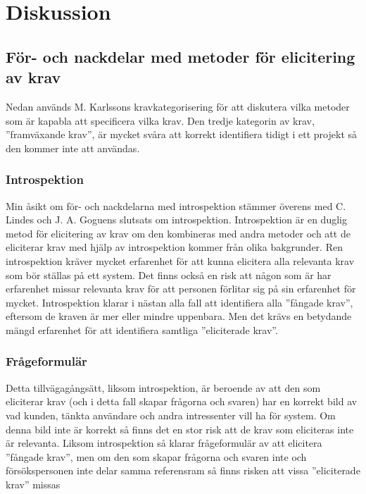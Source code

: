\section{Diskussion}
\label{sec:discussion-jannering}

\subsection{För- och nackdelar med metoder för elicitering av krav}
Nedan används M. Karlssons kravkategorisering för att diskutera vilka metoder som är kapabla att specificera vilka krav. Den tredje kategorin av krav, ”framväxande krav”, är mycket svåra att korrekt identifiera tidigt i ett projekt så den kommer inte att användas.
\subsubsection{Introspektion}
Min åsikt om för- och nackdelarna med introspektion stämmer överens med C. Lindes och J. A. Goguens slutsats om introspektion\cite{goguen1993techniques}. Introspektion är en duglig metod för elicitering av krav om den kombineras med andra metoder och att de eliciterar krav med hjälp av introspektion kommer från olika bakgrunder. Ren introspektion kräver mycket erfarenhet för att kunna elicitera alla relevanta krav som bör ställas på ett system. Det finns också en risk att någon som är har erfarenhet missar relevanta krav för att personen förlitar sig på sin erfarenhet för mycket. Introspektion klarar i nästan alla fall att identifiera alla ”fångade krav”, eftersom de kraven är mer eller mindre uppenbara. Men det krävs en betydande mängd erfarenhet för att identifiera samtliga ”eliciterade krav”.

\subsubsection{Frågeformulär}
Detta tillvägagångsätt, liksom introspektion, är beroende av att den som eliciterar krav (och i detta fall skapar frågorna och svaren) har en korrekt bild av vad kunden, tänkta användare och andra intressenter vill ha för system. Om denna bild inte är korrekt så finns det en stor risk att de krav som eliciteras inte är relevanta. Liksom introspektion så klarar frågeformulär av att elicitera ”fångade krav”, men om den som skapar frågorna och svaren inte och försökspersonen inte delar samma referensram så finns risken att vissa ”eliciterade krav” missas 

